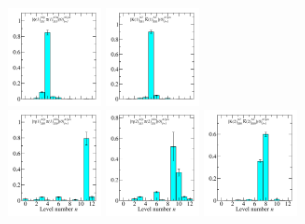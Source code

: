 \begin{figure}
  \includegraphics[width=0.22\textwidth]{figures/spectrum_a1gm/with_tq/zfactors/zfactor_isotriplet_phi_pion-A1gm_1-P001-A2p-SS_1-P00-1-A2m-SS_1.pdf}
  \includegraphics[width=0.22\textwidth]{figures/spectrum_a1gm/with_tq/zfactors/zfactor_isotriplet_kaon_kbar-A1gm_1-P001-A2-SS_1-P00-1-A2-SS_1.pdf}\\
  \includegraphics[width=0.22\textwidth]{figures/spectrum_a1gm/with_tq/zfactors/zfactor_isotriplet_eta_pion-A1gm_1-P001-A2p-SS_0-P00-1-A2m-SS_0.pdf}
  \includegraphics[width=0.22\textwidth]{figures/spectrum_a1gm/with_tq/zfactors/zfactor_isotriplet_eta_pion-A1gm_1-P011-A2p-SS_1-P0-1-1-A2m-SS_1.pdf}
  \includegraphics[width=0.22\textwidth]{figures/spectrum_a1gm/with_tq/zfactors/zfactor_isotriplet_kaon_kbar-A1gm_1-P011-A2-SS_0-P0-1-1-A2-SS_0.pdf}\\[-0.2cm]

\end{figure}
